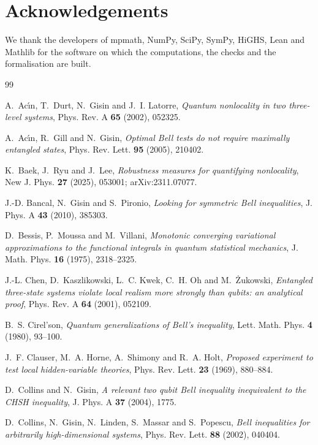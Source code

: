 \documentclass[11pt]{article}
\theoremstyle{remark}
\numberwithin{equation}{section}
\begin{document}
\section*{Acknowledgements}
We thank the developers of mpmath, NumPy, SciPy, SymPy, HiGHS, Lean and Mathlib for the software on which the
computations, the checks and the formalisation are built.

\begin{thebibliography}{99}
\footnotesize\sloppy
\setlength{\itemsep}{0pt}

A.~Ac\'{\i}n, T.~Durt, N.~Gisin and J.~I. Latorre, \emph{Quantum nonlocality in two three-level systems}, Phys. Rev. A
\textbf{65} (2002), 052325.

A.~Ac\'{\i}n, R.~Gill and N.~Gisin, \emph{Optimal Bell tests do not require maximally entangled states}, Phys. Rev.
Lett. \textbf{95} (2005), 210402.

K.~Baek, J.~Ryu and J.~Lee, \emph{Robustness measures for quantifying nonlocality}, New J. Phys. \textbf{27} (2025),
053001; arXiv:2311.07077.

J.-D. Bancal, N.~Gisin and S.~Pironio, \emph{Looking for symmetric Bell inequalities}, J. Phys. A \textbf{43} (2010),
385303.

D.~Bessis, P.~Moussa and M.~Villani, \emph{Monotonic converging variational approximations to the functional integrals
in quantum statistical mechanics}, J. Math. Phys. \textbf{16} (1975), 2318--2325.

J.-L. Chen, D.~Kaszlikowski, L.~C. Kwek, C.~H. Oh and M.~\.Zukowski, \emph{Entangled three-state systems violate local
realism more strongly than qubits: an analytical proof}, Phys. Rev. A \textbf{64} (2001), 052109.

B.~S. Cirel'son, \emph{Quantum generalizations of Bell's inequality}, Lett. Math. Phys. \textbf{4} (1980), 93--100.

J.~F. Clauser, M.~A. Horne, A.~Shimony and R.~A. Holt, \emph{Proposed experiment to test local hidden-variable
theories}, Phys. Rev. Lett. \textbf{23} (1969), 880--884.

D.~Collins and N.~Gisin, \emph{A relevant two qubit Bell inequality inequivalent to the CHSH inequality}, J. Phys. A
\textbf{37} (2004), 1775.

D.~Collins, N.~Gisin, N.~Linden, S.~Massar and S.~Popescu, \emph{Bell inequalities for arbitrarily high-dimensional
systems}, Phys. Rev. Lett. \textbf{88} (2002), 040404.


\end{thebibliography}
\end{document}
